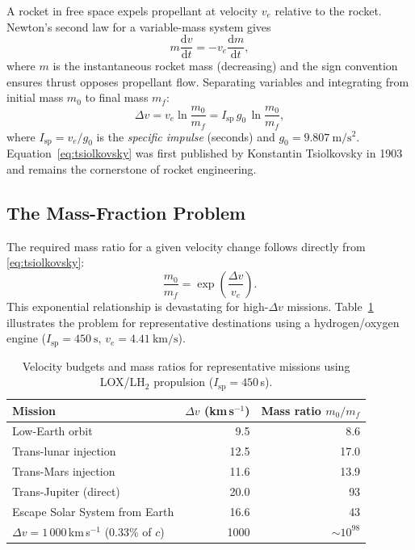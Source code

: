 \documentclass[12pt,a4paper]{article}
\newcommand{\dd}{\mathrm{d}}
\begin{document}
A rocket in free space expels propellant at velocity $v_e$ relative to the
rocket. Newton's second law for a variable-mass system gives
\begin{equation}
  m\frac{\dd v}{\dd t} = -v_e\frac{\dd m}{\dd t},
  \label{eq:newton_var}
\end{equation}
where $m$ is the instantaneous rocket mass (decreasing) and the sign convention
ensures thrust opposes propellant flow. Separating variables and integrating
from initial mass $m_0$ to final mass $m_f$:
\begin{equation}
  \boxed{\Delta v = v_e \ln\!\frac{m_0}{m_f} = I_{\mathrm{sp}}\,g_0\,\ln\!\frac{m_0}{m_f},}
  \label{eq:tsiolkovsky}
\end{equation}
where $I_{\mathrm{sp}} = v_e / g_0$ is the \emph{specific impulse} (seconds)
and $g_0 = \SI{9.807}{\meter\per\second\squared}$.
Equation~\eqref{eq:tsiolkovsky} was first published by Konstantin
Tsiolkovsky in 1903 \citep{Tsiolkovsky1903} and remains the cornerstone of
rocket engineering.

\subsection{The Mass-Fraction Problem}

The required mass ratio for a given velocity change follows directly from
\eqref{eq:tsiolkovsky}:
\begin{equation}
  \frac{m_0}{m_f} = \exp\!\left(\frac{\Delta v}{v_e}\right).
  \label{eq:mass_ratio}
\end{equation}
This exponential relationship is devastating for high-$\Delta v$ missions.
Table~\ref{tab:dv} illustrates the problem for representative destinations
using a hydrogen/oxygen engine ($I_{\mathrm{sp}} = \SI{450}{\second}$,
$v_e = \SI{4.41}{\kilo\meter\per\second}$).

\begin{table}[h]
  \centering
  \caption{Velocity budgets and mass ratios for representative missions using
           LOX/LH$_2$ propulsion ($I_{\mathrm{sp}} = 450$\,s).}
  \label{tab:dv}
  \begin{tabularx}{\textwidth}{Xrr}
    \toprule
    Mission & $\Delta v$ (km\,s$^{-1}$) & Mass ratio $m_0/m_f$ \\
    \midrule
    Low-Earth orbit & 9.5  & 8.6   \\
    Trans-lunar injection & 12.5 & 17.0 \\
    Trans-Mars injection & 11.6 & 13.9 \\
    Trans-Jupiter (direct) & 20.0 & 93    \\
    Escape Solar System from Earth & 16.6 & 43    \\
    $\Delta v = 1\,000$\,km\,s$^{-1}$ (0.33\% of $c$) &
    \num{1000} & $\sim 10^{98}$ \\
    \bottomrule
  \end{tabularx}
\end{table}
\end{document}
